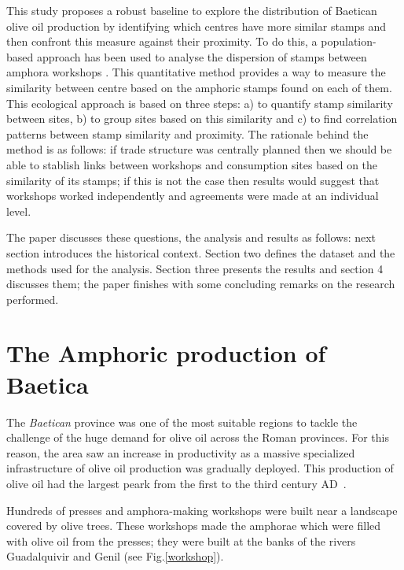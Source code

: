 This study proposes a robust baseline to explore the distribution of Baetican olive oil production by identifying which centres have more similar stamps and then confront this measure against their proximity. To do this, a population-based approach has been used to analyse the dispersion of stamps between amphora workshops \citep{rubio-campillo_ecology_2018}. This quantitative method provides a way to measure the similarity between centre based on the amphoric stamps found on each of them. This ecological approach is based on three steps: a) to quantify stamp similarity between sites, b) to group sites based on this similarity and c) to find correlation patterns between stamp similarity and proximity. The rationale behind the method is as follows: if trade structure was centrally planned then we should be able to stablish links between workshops and consumption sites based on the similarity of its stamps; if this is not the case then results would suggest that workshops worked independently and agreements were made at an individual level.


The paper discusses these questions, the analysis and results as follows: next section introduces the historical context. Section two defines the dataset and the methods used for the analysis. Section three presents the results and section 4 discusses them; the paper finishes with some concluding remarks on the research performed.

\section{The Amphoric production of Baetica}
\label{sec:1}

The \textit{Baetican} province was one of the most suitable regions to tackle the challenge of the huge demand for olive oil across the Roman provinces. For this reason, the area saw an increase in productivity as a massive specialized infrastructure of olive oil production was gradually deployed. This production of olive oil had the largest peark from the first to the third century AD~\citep{remesal_concierto}. 

Hundreds of presses and amphora-making workshops were built near a landscape covered by olive trees. These workshops made the amphorae which were filled with olive oil from the presses; they were built at the banks of the rivers Guadalquivir and Genil (see Fig.\ref{workshop}).

